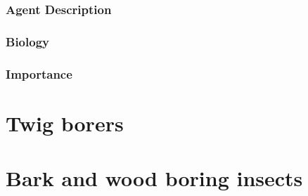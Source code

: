 \documentclass[
]{book}
\begin{document}
\subsection*{Agent Description}\label{agent-description-15}

\subsection*{Biology}\label{biology-15}

\subsection*{Importance}\label{importance-15}

\chapter{Twig borers}\label{twigborer}

\chapter{Bark and wood boring insects}\label{woodborer}


\end{document}
